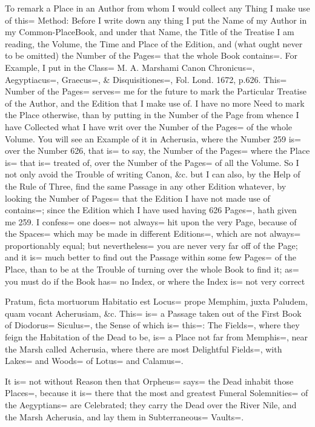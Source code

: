 To remark a Place in an Author from whom I would collect any Thing I make use of this= Method:
Before I write down any thing I put the Name of my Author in my Common-PlaceBook, and under that Name, the Title of the Treatise I am reading, the Volume, the Time and Place of the Edition, and (what ought never to be omitted) the Number of the Pages= that the whole Book contains=.
For Example, I put in the Class= M.
A.
Marshami Canon Chronicus=, Aegyptiacus=, Graecus=, \& Disquisitiones=, Fol.
Lond.
1672, p.626.
This= Number of the Pages= serves= me for the future to mark the Particular Treatise of the Author, and the Edition that I make use of.
I have no more Need to mark the Place otherwise, than by putting in the Number of the Page from whence I have Collected what I have writ over the Number of the Pages= of the whole Volume.
You will see an Example of it in Acherusia, where the Number 259 is= over the Number 626, that is= to say, the Number of the Pages= where the Place is= that is= treated of, over the Number of the Pages= of all the Volume.
So I not only avoid the Trouble of writing Canon, \&c.
but I can also, by the Help of the Rule of Three, find the same Passage in any other Edition whatever, by looking the Number of Pages= that the Edition I have not made use of contains=;
since the Edition which I have used having 626 Pages=, hath given me 259.
I confess= one does= not always= hit upon the very Page, because of the Spaces= which may be made in different Editions=, which are not always= proportionably equal;
but nevertheless= you are never very far off of the Page;
and it is= much better to find out the Passage within some few Pages= of the Place, than to be at the Trouble of turning over the whole Book to find it;
as= you must do if the Book has= no Index, or where the Index is= not very correct

Pratum, ficta mortuorum Habitatio est Locus= prope Memphim, juxta Paludem, quam vocant Acherusiam, \&c.
This= is= a Passage taken out of the First Book of Diodorus= Siculus=, the Sense of which is= this=:
The Fields=, where they feign the Habitation of the Dead to be, is= a Place not far from Memphis=, near the Marsh called Acherusia, where there are most Delightful Fields=, with Lakes= and Woods= of Lotus= and Calamus=.

It is= not without Reason then that Orpheus= says= the Dead inhabit those Places=, because it is= there that the most and greatest Funeral Solemnities= of the Aegyptians= are Celebrated;
they carry the Dead over the River Nile, and the Marsh Acherusia, and lay them in Subterraneous= Vaults=.

